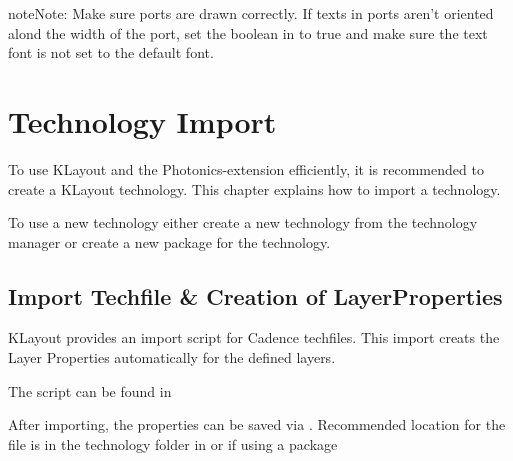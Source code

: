 \documentclass[a4paper,10pt,english]{sphinxmanual}
\begin{document}
\begin{sphinxadmonition}{note}{Note:}
Make sure ports are drawn correctly. If texts in ports aren’t oriented alond the width of the port, set the boolean
 in  to true
and make sure the text font is not set to the default font.
\end{sphinxadmonition}


\chapter{Technology Import}
\label{\detokenize{techfile:technology-import}}\label{\detokenize{techfile::doc}}
To use KLayout and the Photonics-extension efficiently, it is recommended to create a KLayout technology. This chapter explains how to import a technology.

To use a new technology either create a new technology from the technology manager  or create a new package
 for the technology.


\section{Import Techfile \& Creation of LayerProperties}
\label{\detokenize{techfile:import-techfile-creation-of-layerproperties}}
KLayout provides an import script for Cadence techfiles. This import creats the Layer Properties automatically for the defined layers.

The script can be found in 

After importing, the properties can be saved via . Recommended location for the file is in the technology folder in  or if using a package
\end{document}
